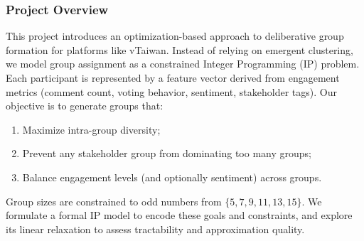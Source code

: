 \subsubsection*{Project Overview}

This project introduces an optimization-based approach
to deliberative group formation for platforms like vTaiwan.
Instead of relying on emergent clustering,
we model group assignment as a constrained Integer Programming (IP) problem.
Each participant is represented by a feature vector derived from engagement metrics
(comment count, voting behavior, sentiment, stakeholder tags).
Our objective is to generate groups that:
\begin{enumerate}
  \item Maximize intra-group diversity;
  \item Prevent any stakeholder group from dominating too many groups;
  \item Balance engagement levels (and optionally sentiment) across groups.
\end{enumerate}
Group sizes are constrained to odd numbers from $\{5,7,9,11,13,15\}$.
We formulate a formal IP model to encode these goals and constraints,
and explore its linear relaxation to assess tractability and approximation quality.
